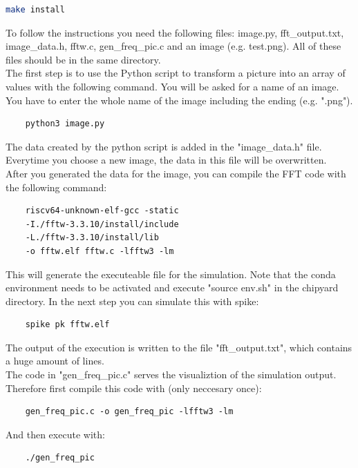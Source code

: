 \documentclass{article}
\begin{document}
{\begin{lstlisting}[language=bash]
    make install
\end{lstlisting}
To follow the instructions you need the following files:  image.py, fft\_output.txt, image\_data.h, fftw.c, gen\_freq\_pic.c and an image (e.g. test.png). All of these files should be in the
same directory.\\
The first step is to use the Python script to transform a picture into an array of values with 
the following command. You will be asked for a name of an image. You have to enter the whole name of the image including the ending (e.g. ".png").\\
\begin{lstlisting}
    python3 image.py
\end{lstlisting} 
The data created by the python script is added in the "image\_data.h" file. Everytime you choose a new image, the data in this file will be overwritten.\\
After you generated the data for the image, you can compile the FFT code with the following command:\\
\begin{lstlisting}
    riscv64-unknown-elf-gcc -static 
    -I./fftw-3.3.10/install/include 
    -L./fftw-3.3.10/install/lib 
    -o fftw.elf fftw.c -lfftw3 -lm
\end{lstlisting}
This will generate the executeable file for the simulation. Note that the conda environment needs to be activated and execute "source env.sh" in the chipyard directory. In the next step you can simulate this with spike:\\
\begin{lstlisting}
    spike pk fftw.elf
\end{lstlisting}
The output of the execution is written to the file "fft\_output.txt", which contains a huge amount of lines.\\
The code in "gen\_freq\_pic.c" serves the visualiztion of the simulation output. Therefore first compile this code with (only neccesary once):\\
\begin{lstlisting}
    gen_freq_pic.c -o gen_freq_pic -lfftw3 -lm
\end{lstlisting}
And then execute with:\\
\begin{lstlisting}
    ./gen_freq_pic
\end{lstlisting}
}
\end{document}
